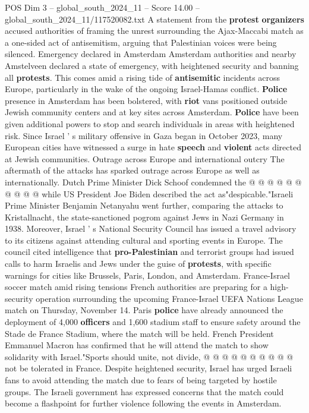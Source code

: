 \begin{textsample}{POS Dim 3 – global\_south\_2024\_11 – Score 14.00 – global\_south\_2024\_11/117520082.txt}
A statement from the \textbf{protest} \textbf{organizers} accused authorities of framing the unrest surrounding the Ajax-Maccabi match as a one-sided act of antisemitism, arguing that Palestinian voices were being silenced.
Emergency declared in Amsterdam Amsterdam authorities and nearby Amstelveen declared a state of emergency, with heightened security and banning all \textbf{protests}.
This comes amid a rising tide of \textbf{antisemitic} incidents across Europe, particularly in the wake of the ongoing Israel-Hamas conflict. \textbf{Police} presence in Amsterdam has been bolstered, with \textbf{riot} vans positioned outside Jewish community centers and at key sites across Amsterdam. \textbf{Police} have been given additional powers to stop and search individuals in areas with heightened risk.
Since Israel ' s military offensive in Gaza began in October 2023, many European cities have witnessed a surge in hate \textbf{speech} and \textbf{violent} acts directed at Jewish communities.
Outrage across Europe and international outcry The aftermath of the attacks has sparked outrage across Europe as well as internationally.
Dutch Prime Minister Dick Schoof condemned the @ @ @ @ @ @ @ @ @ @ while US President Joe Biden described the act as"despicable."Israeli Prime Minister Benjamin Netanyahu went further, comparing the attacks to Kristallnacht, the state-sanctioned pogrom against Jews in Nazi Germany in 1938.
Moreover, Israel ' s National Security Council has issued a travel advisory to its citizens against attending cultural and sporting events in Europe.
The council cited intelligence that \textbf{pro-Palestinian} and terrorist groups had issued calls to harm Israelis and Jews under the guise of \textbf{protests}, with specific warnings for cities like Brussels, Paris, London, and Amsterdam.
France-Israel soccer match amid rising tensions French authorities are preparing for a high-security operation surrounding the upcoming France-Israel UEFA Nations League match on Thursday, November 14.
Paris \textbf{police} have already announced the deployment of 4,000 \textbf{officers} and 1,600 stadium staff to ensure safety around the Stade de France Stadium, where the match will be held.
French President Emmanuel Macron has confirmed that he will attend the match to show solidarity with Israel."Sports should unite, not divide, @ @ @ @ @ @ @ @ @ @ not be tolerated in France.
Despite heightened security, Israel has urged Israeli fans to avoid attending the match due to fears of being targeted by hostile groups.
The Israeli government has expressed concerns that the match could become a flashpoint for further violence following the events in Amsterdam.

\end{textsample}
